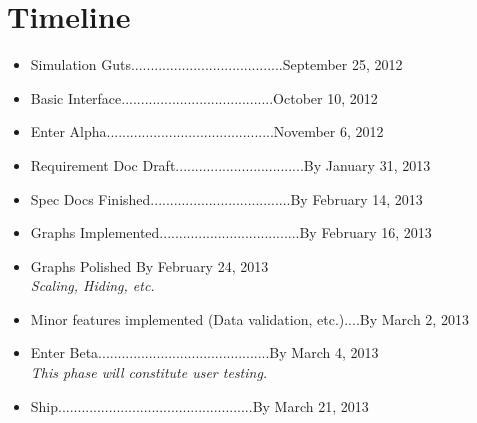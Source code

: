 \documentclass{report}
\begin{document}
	\section{Timeline}
		\begin{itemize}
			\item Simulation Guts.......................................September 25, 2012
			\item Basic Interface.......................................October 10, 2012
			\item Enter Alpha...........................................November 6, 2012
			\item Requirement Doc Draft.................................By January 31, 2013
			\item Spec Docs Finished....................................By February 14, 2013
			\item Graphs Implemented....................................By February 16, 2013
			\item Graphs Polished										By February 24, 2013\\
					\textit{Scaling, Hiding, etc.}
			\item Minor features implemented (Data validation, etc.)....By March 2, 2013
			\item Enter Beta............................................By March 4, 2013\\
					\textit{This phase will constitute user testing.}
			\item Ship..................................................By March 21, 2013
		\end{itemize}
\end{document}
